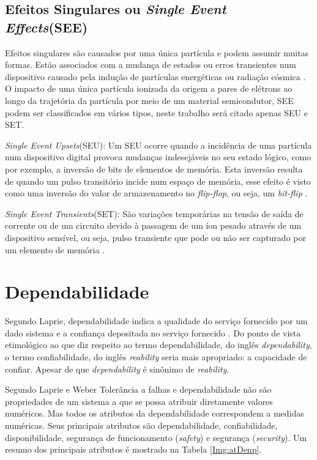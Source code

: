 \subsection{Efeitos Singulares ou \textit{Single Event Effects}(SEE)} \label{subsec:EfeitosSingulares}

Efeitos singulares são causados por uma única partícula e podem assumir muitas formas. Estão associados com a mudança de estados ou erros transientes num dispositivo causado pela indução de partículas energéticas ou radiação cósmica \cite{Yu:2008}. O impacto de uma única partícula ionizada da origem a pares de elétrons ao longo da trajetória da partícula por meio de um material semicondutor, SEE podem ser classificados em vários tipos, neste trabalho será citado apenas SEU e SET.

\textit{Single Event Upsets}(SEU): Um SEU ocorre quando a incidência de uma partícula num dispositivo digital provoca mudanças indesejáveis no seu estado lógico, como por exemplo, a inversão de bits de elementos de memória. Esta inversão resulta de quando um pulso transitório incide num espaço de memória, esse efeito é visto como uma inversão do valor de armazenamento no \textit{flip-flop}, ou seja, um \textit{bit-flip} \cite{Normand:1996}.

\textit{Single Event Transients}(SET): São variações temporárias na tensão de saída de corrente ou de um circuito
devido à passagem de um íon pesado através de um dispositivo sensível, ou seja, pulso transiente que pode ou não ser capturado por um elemento de memória \cite{Ecoffet:1994}.



\section{Dependabilidade} \label{sec:denpendabilidade}

Segundo Laprie, dependabilidade indica a qualidade do serviço fornecido por um dado sistema e a confiança depositada no serviço fornecido \cite{LaprieAcidente:1990}. Do ponto de vista etimológico ao que diz respeito ao termo dependabilidade, do inglês \textit{dependability}, o termo confiabilidade, do inglês \textit{reability} seria mais apropriado: a capacidade de confiar. Apesar de que \textit{dependability} é sinônimo de \textit{reability}. 

Segundo Laprie e Weber \cite{Weber:2002, LaprieAcidente:1990} Tolerância a falhas e dependabilidade não são propriedades de um sistema a que se possa atribuir diretamente valores numéricos. Mas todos os atributos da dependabilidade correspondem a medidas numéricas. Seus principais atributos são dependabilidade, confiabilidade, disponibilidade, segurança de funcionamento (\textit{safety}) e segurança (\textit{security}). Um resumo dos principais
atributos é mostrado na Tabela \ref{Img:atDenp}.     


